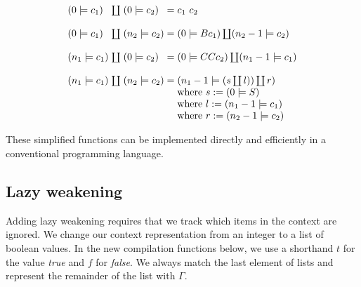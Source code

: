 \documentclass[conference]{IEEEtran}
\begin{document}
\begin{equation*}
    \arraycolsep=1.4pt
    \begin{array}{l l l l l}
        (0 \models c_1)   & \coprod & (0 \models c_2)   & = & c_1 \ c_2                                         \\
        \\
        (0 \models c_1)   & \coprod & (n_2 \models c_2) & = & (0 \models B c_1) \coprod (n_2 - 1 \models c_2)   \\
        \\
        (n_1 \models c_1) & \coprod & (0 \models c_2)   & = & (0 \models C C c_2) \coprod (n_1 - 1 \models c_1) \\
        \\
        (n_1 \models c_1) & \coprod & (n_2 \models c_2) & = & (n_1 - 1 \models (s \coprod l)) \coprod r)        \\
                          &         &                   &   & \text{where } s := (0 \models S )                 \\
                          &         &                   &   & \text{where } l := (n_1-1 \models c_1 )           \\
                          &         &                   &   & \text{where } r := (n_2-1 \models c_2 )           \\
    \end{array}
\end{equation*}

These simplified functions can be implemented directly and efficiently in a conventional programming language.

\subsection{Lazy weakening}
Adding lazy weakening requires that we track which items in the context are ignored.
We change our context representation from an integer to a list of boolean values.
In the new compilation functions below, we use a shorthand $t$ for the value \textit{true} and $f$ for \textit{false}.
We always match the last element of lists and represent the remainder of the list with $\Gamma$.
\end{document}
